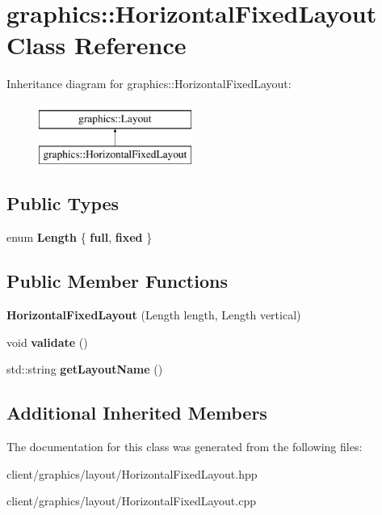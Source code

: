 \hypertarget{classgraphics_1_1_horizontal_fixed_layout}{\section{graphics\-:\-:Horizontal\-Fixed\-Layout Class Reference}
\label{classgraphics_1_1_horizontal_fixed_layout}
}
Inheritance diagram for graphics\-:\-:Horizontal\-Fixed\-Layout\-:\begin{figure}[H]
\begin{center}
\leavevmode
\includegraphics[height=2.000000cm]{classgraphics_1_1_horizontal_fixed_layout}
\end{center}
\end{figure}
\subsection*{Public Types}
\begin{DoxyCompactItemize}
\item 
enum {\bfseries Length} \{ {\bfseries full}, 
{\bfseries fixed}
 \}
\end{DoxyCompactItemize}
\subsection*{Public Member Functions}
\begin{DoxyCompactItemize}
\item 
\hypertarget{classgraphics_1_1_horizontal_fixed_layout_a8a775fdcf254c155d8192490c650cc9e}{{\bfseries Horizontal\-Fixed\-Layout} (Length length, Length vertical)}\label{classgraphics_1_1_horizontal_fixed_layout_a8a775fdcf254c155d8192490c650cc9e}

\item 
\hypertarget{classgraphics_1_1_horizontal_fixed_layout_af87c845e53cc5b4f223d31f29f7ff752}{void {\bfseries validate} ()}\label{classgraphics_1_1_horizontal_fixed_layout_af87c845e53cc5b4f223d31f29f7ff752}

\item 
\hypertarget{classgraphics_1_1_horizontal_fixed_layout_a2d6dc1cc40b8aa4869d82d64d0e812c9}{std\-::string {\bfseries get\-Layout\-Name} ()}\label{classgraphics_1_1_horizontal_fixed_layout_a2d6dc1cc40b8aa4869d82d64d0e812c9}

\end{DoxyCompactItemize}
\subsection*{Additional Inherited Members}


The documentation for this class was generated from the following files\-:\begin{DoxyCompactItemize}
\item 
client/graphics/layout/Horizontal\-Fixed\-Layout.\-hpp\item 
client/graphics/layout/Horizontal\-Fixed\-Layout.\-cpp\end{DoxyCompactItemize}
